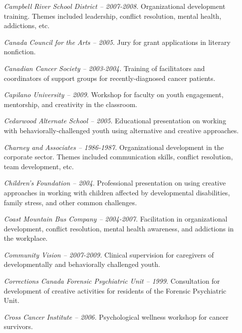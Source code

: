 \documentclass[10pt,DIV09,letterpaper,oneside,headsepline]{scrreprt}
\begin{document}
\begin{itemize}
\item [\textit{Campbell River School District -- 2007-2008.}]
Organizational development training. Themes included leadership, conflict resolution, mental health, addictions, etc.

 \item [\textit{Canada Council for the Arts -- 2005.}]
Jury for grant applications in literary nonfiction.

\item [\textit{Canadian Cancer Society -- 2003-2004.}]
Training of facilitators and coordinators of support groups for recently-diagnosed cancer patients.

\item [\textit{Capilano University -- 2009.}]
Workshop for faculty on youth engagement, mentorship, and creativity in the classroom.

\item [\textit{Cedarwood Alternate School -- 2005.}]
Educational presentation on working with behaviorally-challenged youth using alternative and creative approaches.

\item [\textit{Charney and Associates -- 1986-1987.}]
Organizational development in the corporate sector. Themes included communication skills, conflict resolution, team development, etc.

\item [\textit{Children's Foundation -- 2004.}]
Professional presentation on using creative approaches in working with children affected by developmental disabilities, family stress, and other common challenges.

\item [\textit{Coast Mountain Bus Company -- 2004-2007.}]
Facilitation in organizational development, conflict resolution, mental health awareness, and addictions in the workplace.

\item [\textit{Community Vision -- 2007-2009.}]
Clinical supervision for caregivers of developmentally and behaviorally challenged youth.

\item [\textit{Corrections Canada Forensic Psychiatric Unit -- 1999.}]
Consultation for development of creative activities for residents of the Forensic Psychiatric Unit.

\item [\textit{Cross Cancer Institute -- 2006.}]
Psychological wellness workshop for cancer survivors.


\end{itemize}
\end{document}
